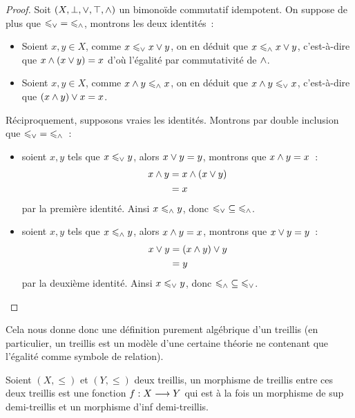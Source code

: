 \begin{proof}
  Soit $(X,\bot,\vee,\top,\wedge)$ un bimonoïde commutatif idempotent. On
  suppose de plus que $\mathord{\leqslant_{\vee}} = \mathord{\leqslant_{\wedge}}$,
  montrons les deux identités~:
  \begin{itemize}
  \item Soient $x,y\in X$, comme $x\leqslant_{\vee} x\vee y$, on en déduit que
    $x\leqslant_{\wedge} x\lor y$, c'est-à-dire que $x\wedge (x\vee y) = x$ d'où
    l'égalité par commutativité de $\wedge$.
  \item Soient $x,y\in X$, comme $x\wedge y\leqslant_{\wedge} x$, on en déduit que
    $x\wedge y \leqslant_{\vee} x$, c'est-à-dire que $(x\wedge y)\vee x = x$.
  \end{itemize}

  Réciproquement, supposons vraies les identités. Montrons par double inclusion
  que $\mathord{\leqslant_{\vee}} = \mathord{\leqslant_{\wedge}}$~:
  \begin{itemize}
  \item soient $x,y$ tels que $x\leqslant_{\vee} y$, alors $x\vee y = y$,
    montrons que $x\wedge y = x$~:
    \begin{align*}
      x \wedge y &= x \wedge (x \vee y)\\
      &= x
    \end{align*}
    par la première identité. Ainsi $x\leqslant_{\wedge} y$, donc
    $\mathord{\leqslant_{\vee}}\subseteq\mathord{\leqslant_{\wedge}}$.
  \item soient $x,y$ tels que $x\leqslant_{\wedge} y$, alors $x\wedge y = x$,
    montrons que $x\vee y = y$~:
    \begin{align*}
      x \vee y &= (x\wedge y) \vee y\\
      &= y
    \end{align*}
    par la deuxième identité. Ainsi $x\leqslant_{\vee} y$, donc
    $\mathord{\leqslant_{\wedge}}\subseteq\mathord{\leqslant_{\vee}}$.\qedhere
  \end{itemize}
\end{proof}

Cela nous donne donc une définition purement algébrique d'un treillis (en
particulier, un treillis est un modèle d'une certaine théorie ne contenant que
l'égalité comme symbole de relation).

\begin{definition}
  Soient $(X,\leq)$ et $(Y,\leq)$ deux treillis, un morphisme de treillis entre
  ces deux treillis est une fonction $f : \displaystyle X \longrightarrow Y$ qui est à la fois
  un morphisme de sup demi-treillis et un morphisme d'inf demi-treillis.
\end{definition}

